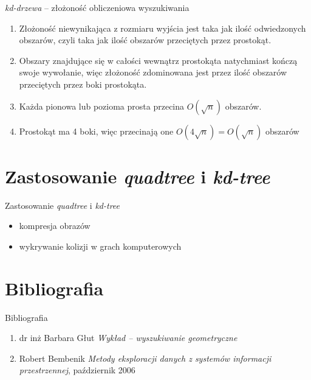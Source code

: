 \documentclass{beamer}
\begin{document}
\begin{frame}{\textit{kd-drzewa} -- złożoność obliczeniowa wyszukiwania}
     \begin{enumerate}
        \item<1-> Złożoność niewynikająca z rozmiaru wyjścia jest taka jak ilość odwiedzonych obszarów, czyli taka jak ilość obszarów przeciętych przez prostokąt.
        \item<2-> Obszary znajdujące się w całości wewnątrz prostokąta natychmiast kończą swoje wywołanie, więc złożoność zdominowana jest przez ilość obszarów przeciętych przez boki prostokąta.
        \item<3-> Każda pionowa lub pozioma prosta przecina $O(\sqrt{n})$ obszarów.
        \item<4-> Prostokąt ma 4 boki, więc przecinają one $O(4\sqrt{n}) = O(\sqrt{n})$ obszarów
    \end{enumerate}
\end{frame}

\section{Zastosowanie \textit{quadtree} i \textit{kd-tree}}
\begin{frame}{Zastosowanie \textit{quadtree} i \textit{kd-tree}}
    \begin{itemize}
        \item kompresja obrazów
        \item wykrywanie kolizji w grach komputerowych
    \end{itemize}
\end{frame}

\section{Bibliografia}
\begin{frame}{Bibliografia}
\begin{enumerate}
    \item dr inż Barbara Głut \textit{Wykład -- wyszukiwanie geometryczne}
    \item Robert Bembenik \textit{Metody eksploracji danych z systemów informacji przestrzennej}, październik 2006
\end{enumerate}
\end{frame}
\end{document}
